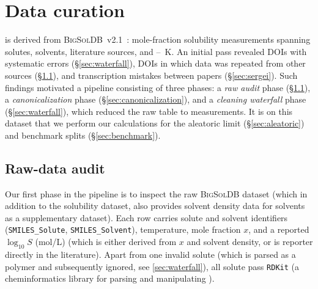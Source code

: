 \section{Data curation}
\label{sec:data_curation}

\scthree{} is derived from \textsc{BigSolDB}~v2.1~\citep{krasnov2025bigsoldb}:
 mole-fraction solubility measurements spanning
 solutes,  solvents,  literature
sources, and --~K.
An initial pass revealed  DOIs with systematic errors (§\ref{sec:waterfall}),  DOIs in which data was repeated from other sources (§\ref{sec:raw_audit}), and transcription mistakes between papers (§\ref{sec:sergei}).
Such findings motivated a pipeline consisting of three phases: a \emph{raw
audit} phase (§\ref{sec:raw_audit}), a \emph{canonicalization} phase (§\ref{sec:canonicalization}), and a \emph{cleaning waterfall} phase (§\ref{sec:waterfall}),
which reduced the raw table to  measurements. It is on this dataset that
we perform our calculations for the aleatoric limit (§\ref{sec:aleatoric}) and benchmark
splits (§\ref{sec:benchmark}).

\subsection{Raw-data audit}
\label{sec:raw_audit}

Our first phase in the pipeline is to inspect the raw \textsc{BigSolDB} dataset (which in addition to the solubility dataset, also provides solvent density data for solvents as a supplementary dataset). Each row carries solute and solvent identifiers (\texttt{SMILES\_Solute}, \texttt{SMILES\_Solvent}), temperature,
mole fraction $x$, and a reported $\log_{10} S$ (mol/L) (which is either derived
from $x$ and solvent density, or is reporter directly in the literature).
Apart from one invalid solute \SMILES{} (which is parsed as a polymer and subsequently ignored, see \ref{sec:waterfall}), all  solute \SMILES{} pass \texttt{RDKit} (a cheminformatics library for parsing and manipulating \SMILES{}).

